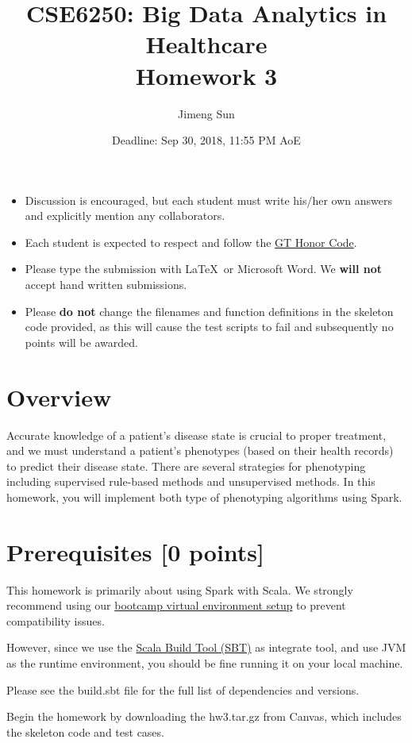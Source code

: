 \documentclass[12pt]{article}
\title{CSE6250: Big Data Analytics in Healthcare \\ Homework 3}
\author{Jimeng Sun}
\date{Deadline: Sep 30, 2018, 11:55 PM AoE}
\begin{document}
\maketitle
\begin{itemize}
\item Discussion is encouraged, but each student must write his/her own answers and explicitly mention any collaborators.
\item Each student is expected to respect and follow the \href{http://osi.gatech.edu/content/honor-code}{ GT Honor Code}.
\item Please type the submission with \LaTeX\ or Microsoft Word. We \textbf{will not} accept hand written submissions.
\item Please \textbf{do not} change the filenames and function definitions in the skeleton code provided, as this will cause the test scripts to fail and subsequently no points will be awarded. 
\end{itemize}


\section*{Overview}
Accurate knowledge of a patient's disease state is crucial to proper treatment, and we must understand a patient's phenotypes (based on their health records) to predict their disease state. There are several strategies for phenotyping including supervised rule-based methods and unsupervised methods. In this homework, you will implement both type of phenotyping algorithms using Spark.

\section*{Prerequisites [0 points]}
This homework is primarily about using Spark with Scala. We strongly recommend using our \href{http://www.sunlab.org/teaching/cse6250/fall2018/env}{bootcamp virtual environment setup} to prevent compatibility issues.

However, since we use the \href{http://www.scala-sbt.org/}{Scala Build Tool (SBT)} as integrate tool, and use JVM as the runtime environment, you should be fine running it on your local machine.

Please see the build.sbt file for the full list of dependencies and versions.

Begin the homework by downloading the hw3.tar.gz from Canvas, which includes the skeleton code and test cases. 
\end{document}

